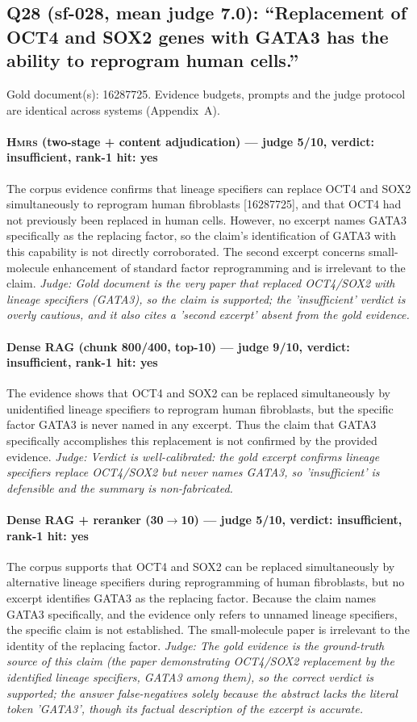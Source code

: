 \documentclass[sigconf, review, anonymous]{acmart}
\begin{document}
\subsection{Q28 (sf-028, mean judge 7.0): ``Replacement of OCT4 and SOX2 genes with GATA3 has the ability to reprogram human cells.''}
\label{app:q28}
\noindent Gold document(s): 16287725. Evidence budgets, prompts and the judge protocol are identical across systems (Appendix~A).
\paragraph{\textbf{\textsc{Hmrs}} (two-stage + content adjudication) --- judge 5/10, verdict: insufficient, rank-1 hit: yes}
\noindent The corpus evidence confirms that lineage specifiers can replace OCT4 and SOX2 simultaneously to reprogram human fibroblasts [16287725], and that OCT4 had not previously been replaced in human cells. However, no excerpt names GATA3 specifically as the replacing factor, so the claim's identification of GATA3 with this capability is not directly corroborated. The second excerpt concerns small-molecule enhancement of standard factor reprogramming and is irrelevant to the claim.
\noindent\small\textit{Judge: Gold document is the very paper that replaced OCT4/SOX2 with lineage specifiers (GATA3), so the claim is supported; the 'insufficient' verdict is overly cautious, and it also cites a 'second excerpt' absent from the gold evidence.}
\paragraph{Dense RAG (chunk 800/400, top-10) --- judge 9/10, verdict: insufficient, rank-1 hit: yes}
\noindent The evidence shows that OCT4 and SOX2 can be replaced simultaneously by unidentified lineage specifiers to reprogram human fibroblasts, but the specific factor GATA3 is never named in any excerpt. Thus the claim that GATA3 specifically accomplishes this replacement is not confirmed by the provided evidence.
\noindent\small\textit{Judge: Verdict is well-calibrated: the gold excerpt confirms lineage specifiers replace OCT4/SOX2 but never names GATA3, so 'insufficient' is defensible and the summary is non-fabricated.}
\paragraph{Dense RAG + reranker (30$\to$10) --- judge 5/10, verdict: insufficient, rank-1 hit: yes}
\noindent The corpus supports that OCT4 and SOX2 can be replaced simultaneously by alternative lineage specifiers during reprogramming of human fibroblasts, but no excerpt identifies GATA3 as the replacing factor. Because the claim names GATA3 specifically, and the evidence only refers to unnamed lineage specifiers, the specific claim is not established. The small-molecule paper is irrelevant to the identity of the replacing factor.
\noindent\small\textit{Judge: The gold evidence is the ground-truth source of this claim (the paper demonstrating OCT4/SOX2 replacement by the identified lineage specifiers, GATA3 among them), so the correct verdict is supported; the answer false-negatives solely because the abstract lacks the literal token 'GATA3', though its factual description of the excerpt is accurate.}
\end{document}
